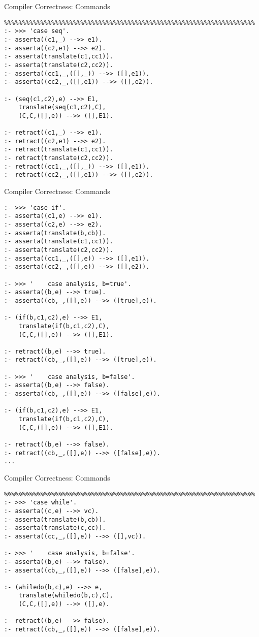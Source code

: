 \documentclass{beamer}
\begin{document}
\begin{frame}[fragile]{Compiler Correctness: Commands}

\tiny
\begin{verbatim}
%%%%%%%%%%%%%%%%%%%%%%%%%%%%%%%%%%%%%%%%%%%%%%%%%%%%%%%%%%%%%%%%%%%%%
:- >>> 'case seq'.
:- asserta((c1,_) -->> e1).
:- asserta((c2,e1) -->> e2).
:- asserta(translate(c1,cc1)).
:- asserta(translate(c2,cc2)).
:- asserta((cc1,_,([],_)) -->> ([],e1)).
:- asserta((cc2,_,([],e1)) -->> ([],e2)).

:- (seq(c1,c2),e) -->> E1,
    translate(seq(c1,c2),C),
    (C,C,([],e)) -->> ([],E1).

:- retract((c1,_) -->> e1).
:- retract((c2,e1) -->> e2).
:- retract(translate(c1,cc1)).
:- retract(translate(c2,cc2)).
:- retract((cc1,_,([],_)) -->> ([],e1)).
:- retract((cc2,_,([],e1)) -->> ([],e2)).
\end{verbatim}
\end{frame}



\begin{frame}[fragile]{Compiler Correctness: Commands}

\tiny
\begin{verbatim}
:- >>> 'case if'.
:- asserta((c1,e) -->> e1).
:- asserta((c2,e) -->> e2).
:- asserta(translate(b,cb)).
:- asserta(translate(c1,cc1)).
:- asserta(translate(c2,cc2)).
:- asserta((cc1,_,([],e)) -->> ([],e1)).
:- asserta((cc2,_,([],e)) -->> ([],e2)).

:- >>> '    case analysis, b=true'.
:- asserta((b,e) -->> true).
:- asserta((cb,_,([],e)) -->> ([true],e)).

:- (if(b,c1,c2),e) -->> E1,
    translate(if(b,c1,c2),C),
    (C,C,([],e)) -->> ([],E1).

:- retract((b,e) -->> true).
:- retract((cb,_,([],e)) -->> ([true],e)).

:- >>> '    case analysis, b=false'.
:- asserta((b,e) -->> false).
:- asserta((cb,_,([],e)) -->> ([false],e)).

:- (if(b,c1,c2),e) -->> E1,
    translate(if(b,c1,c2),C),
    (C,C,([],e)) -->> ([],E1).

:- retract((b,e) -->> false).
:- retract((cb,_,([],e)) -->> ([false],e)).
...
\end{verbatim}
\end{frame}

\begin{frame}[fragile]{Compiler Correctness: Commands}

\tiny
\begin{verbatim}
%%%%%%%%%%%%%%%%%%%%%%%%%%%%%%%%%%%%%%%%%%%%%%%%%%%%%%%%%%%%%%%%%%%%%
:- >>> 'case while'.
:- asserta((c,e) -->> vc).
:- asserta(translate(b,cb)).
:- asserta(translate(c,cc)).
:- asserta((cc,_,([],e)) -->> ([],vc)).

:- >>> '    case analysis, b=false'.
:- asserta((b,e) -->> false).
:- asserta((cb,_,([],e)) -->> ([false],e)).

:- (whiledo(b,c),e) -->> e,
    translate(whiledo(b,c),C),
    (C,C,([],e)) -->> ([],e).

:- retract((b,e) -->> false).
:- retract((cb,_,([],e)) -->> ([false],e)).
\end{verbatim}
\end{frame}
\end{document}
